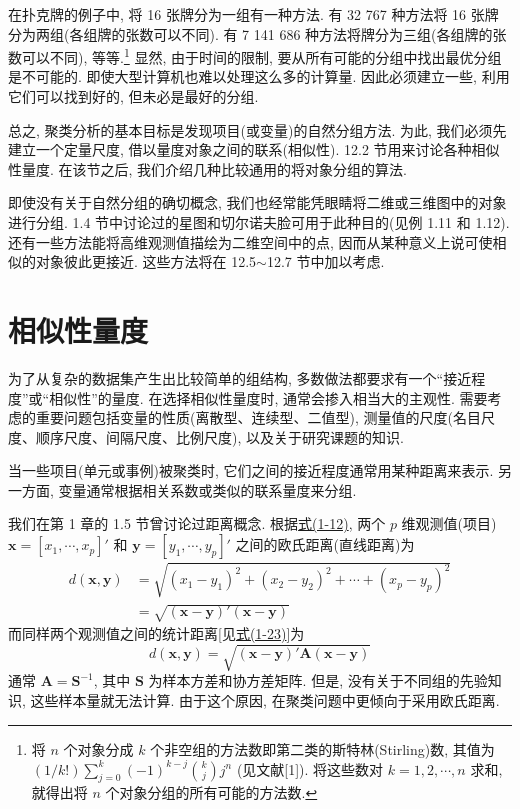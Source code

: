 
在扑克牌的例子中, 将 16 张牌分为一组有一种方法. 有 32 767 种方法将 16 张牌分为两组(各组牌的张数可以不同). 有 7 141 686 种方法将牌分为三组(各组牌的张数可以不同), 等等.\footnote{将 $n$ 个对象分成 $k$ 个非空组的方法数即第二类的斯特林(Stirling)数, 其值为 $(1/k!)\sum_{j=0}^{k}(-1)^{k-j}\binom{k}{j}j^{n}$ (见文献[1]). 将这些数对 $k=1,2,\cdots,n$ 求和, 就得出将 $n$ 个对象分组的所有可能的方法数.} 显然, 由于时间的限制, 要从所有可能的分组中找出最优分组是不可能的. 即使大型计算机也难以处理这么多的计算量. 因此必须建立一些, 利用它们可以找到好的, 但未必是最好的分组.

总之, 聚类分析的基本目标是发现项目(或变量)的自然分组方法. 为此, 我们必须先建立一个定量尺度, 借以量度对象之间的联系(相似性). 12.2 节用来讨论各种相似性量度. 在该节之后, 我们介绍几种比较通用的将对象分组的算法.

即使没有关于自然分组的确切概念, 我们也经常能凭眼睛将二维或三维图中的对象进行分组. 1.4 节中讨论过的星图和切尔诺夫脸可用于此种目的(见例 1.11 和 1.12). 还有一些方法能将高维观测值描绘为二维空间中的点, 因而从某种意义上说可使相似的对象彼此更接近. 这些方法将在 12.5$\sim$12.7 节中加以考虑.

\section{相似性量度}
\label{sec:12.2}

为了从复杂的数据集产生出比较简单的组结构, 多数做法都要求有一个“接近程度”或“相似性”的量度. 在选择相似性量度时, 通常会掺入相当大的主观性. 需要考虑的重要问题包括变量的性质(离散型、连续型、二值型), 测量值的尺度(名目尺度、顺序尺度、间隔尺度、比例尺度), 以及关于研究课题的知识.

当一些项目(单元或事例)被聚类时, 它们之间的接近程度通常用某种距离来表示. 另一方面, 变量通常根据相关系数或类似的联系量度来分组.


我们在第 1 章的 1.5 节曾讨论过距离概念. 根据\hyperref[eq:1-12]{式(1-12)}, 两个 $p$ 维观测值(项目) $\mathbf{x}=[x_1,\cdots,x_p]'$ 和 $\mathbf{y}=[y_1,\cdots,y_p]'$ 之间的欧氏距离(直线距离)为
\label{eq:12-1}
\begin{equation}
\begin{aligned}
d(\mathbf{x},\mathbf{y})&=\sqrt{(x_1-y_1)^2+(x_2-y_2)^2+\cdots+(x_p-y_p)^2}\\
&=\sqrt{(\mathbf{x}-\mathbf{y})'(\mathbf{x}-\mathbf{y})}
\end{aligned}
\tag{12-1}
\end{equation}
而同样两个观测值之间的统计距离[见\hyperref[eq:1-23]{式(1-23)}]为
\label{eq:12-2}
\begin{equation}
d(\mathbf{x},\mathbf{y})=\sqrt{(\mathbf{x}-\mathbf{y})'\mathbf{A}(\mathbf{x}-\mathbf{y})}
\tag{12-2}
\end{equation}
通常 $\mathbf{A}=\mathbf{S}^{-1}$, 其中 $\mathbf{S}$ 为样本方差和协方差矩阵. 但是, 没有关于不同组的先验知识, 这些样本量就无法计算. 由于这个原因, 在聚类问题中更倾向于采用欧氏距离.

